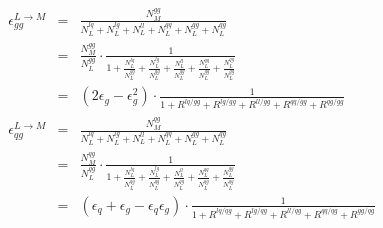 \documentclass[12pt,oneandhalf,chaparabic,phys,ms,eng]{metu}
\begin{document}
\begin{eqnarray}
\epsilon_{gg}^{L \rightarrow M} & = & \frac{N_{M}^{gg}}{N_{L}^{lq}+N_{L}^{lg}+N_{L}^{ll}+N_{L}^{qq}+N_{L}^{gg}+N_{L}^{qg}} \nonumber \\
& = &
\frac{N_{M}^{gg}}{N_{L}^{gg}} \cdot \frac{1}{1 + \frac{N_{L}^{lq}}{N_{L}^{gg}} + \frac{N_{L}^{lg}}{N_{L}^{gg}} + \frac{N_{L}^{ll}}{N_{L}^{gg}} + \frac{N_{L}^{qq}}{N_{L}^{gg}} + \frac{N_{L}^{qg}}{N_{L}^{gg}}} \nonumber \\
& = & \left( 2 \epsilon_{g} - \epsilon_{g}^{2} \right) \cdot \frac{1}{1 + R^{lq/gg} + R^{lg/gg} + R^{ll/gg} + R^{qq/gg} + R^{qg/gg}} \label{eq:eps15__}\\
\epsilon_{qg}^{L \rightarrow M} & = & \frac{N_{M}^{qg}}{N_{L}^{lq}+N_{L}^{lg}+N_{L}^{ll}+N_{L}^{qq}+N_{L}^{gg}+N_{L}^{qg}} \nonumber \\
& = &
\frac{N_{M}^{qg}}{N_{L}^{qg}} \cdot \frac{1}{1 + \frac{N_{L}^{lq}}{N_{L}^{qg}} + \frac{N_{L}^{lg}}{N_{L}^{qg}} + \frac{N_{L}^{ll}}{N_{L}^{qg}} + \frac{N_{L}^{qq}}{N_{L}^{qg}} + \frac{N_{L}^{gg}}{N_{L}^{qg}}} \nonumber \\
& = & \left( \epsilon_{q} + \epsilon_{g} - \epsilon_{q} \epsilon_{g} \right) \cdot \frac{1}{1 + R^{lq/qg} + R^{lg/qg} + R^{ll/qg} + R^{qq/qg} + R^{gg/qg}} \label{eq:eps16__}
\end{eqnarray}
\end{document}
